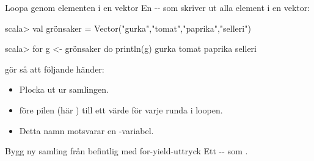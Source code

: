 \begin{Slide}{Loopa genom elementen i en vektor}
En -- som skriver ut alla element i en vektor:
\begin{REPL}
scala> val grönsaker = Vector("gurka","tomat","paprika","selleri")

scala> for g <- grönsaker do println(g)
gurka
tomat
paprika
selleri

\end{REPL}
 gör så att följande händer:
\begin{itemize}
  \item Plocka ut  ur samlingen. 
  \item {} före pilen (här )  till ett  värde för varje runda i loopen.
  \item Detta namn motsvarar en  -variabel.
\end{itemize}
\end{Slide}


\begin{Slide}{Bygg ny samling från befintlig med for-yield-uttryck}
Ett -- som .



\end{Slide}


